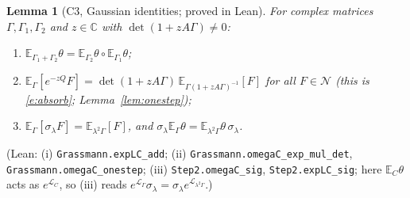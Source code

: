 \documentclass[11pt]{amsart}
\newtheorem{lemma}[theorem]{Lemma}
\theoremstyle{definition}
\theoremstyle{remark}
\numberwithin{equation}{section}
\newcommand{\C}{\mathbb{C}}
\newcommand{\E}{\mathbb{E}}
\newcommand{\cN}{\mathcal{N}}
\begin{document}
\begin{lemma}[C3, Gaussian identities; proved in Lean]\label{lem:C3}
For complex matrices $\Gamma,\Gamma_1,\Gamma_2$ and $z\in\C$ with $\det(1+zA\Gamma)\ne0$:
\begin{enumerate}
\item[(i)] $\E_{\Gamma_1+\Gamma_2}\theta=\E_{\Gamma_2}\theta\circ\E_{\Gamma_1}\theta$;
\item[(ii)] $\E_\Gamma[e^{-zQ}F]=\det(1+zA\Gamma)\,\E_{\Gamma(1+zA\Gamma)^{-1}}[F]$ for all
  $F\in\cN$ (this is \eqref{e:absorb}; Lemma~\ref{lem:onestep});
\item[(iii)] $\E_\Gamma[\sigma_\lambda F]=\E_{\lambda^2\Gamma}[F]$, and
  $\sigma_\lambda\E_\Gamma\theta=\E_{\lambda^2\Gamma}\theta\,\sigma_\lambda$.
\end{enumerate}
\end{lemma}
(Lean: (i) \texttt{Grassmann.expLC\_add}; (ii) \texttt{Grassmann.omegaC\_exp\_mul\_det},
\texttt{Grassmann.omegaC\_onestep}; (iii) \texttt{Step2.omegaC\_sig}, \texttt{Step2.expLC\_sig};
here $\E_C\theta$ acts as $e^{\mathcal L_C}$, so (iii) reads
$e^{\mathcal L_\Gamma}\sigma_\lambda=\sigma_\lambda e^{\mathcal L_{\lambda^2\Gamma}}$.)
\end{document}
